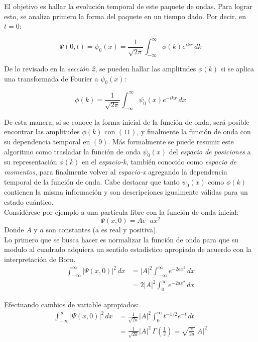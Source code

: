 El objetivo es hallar la evolución temporal de este paquete de ondas. Para lograr esto, se analiza primero la forma del 
paquete en un tiempo dado. Por decir, en $t=0$:

\begin{equation}
    \Psi(0,t) = \psi_{0}(x) = \frac{1}{\sqrt{2\pi}} \int_{-\infty}^{\infty} \phi(k)e^{ikx}\,dk
\end{equation}

De lo revisado en la \emph{sección 2}, se pueden hallar las amplitudes $\phi(k)$ si se aplica una transformada de Fourier
a $\psi_{0}(x)$:

\begin{equation}
    \phi(k) = \frac{1}{\sqrt{2\pi}} \int_{-\infty}^{\infty} \psi_{0}(x)e^{-ikx}\,dx
\end{equation}

De esta manera, si se conoce la forma inicial de la función de onda, será posible encontrar las amplitudes $\phi(k)$ con
$(11)$, y finalmente la función de onda con su dependencia temporal en $(9)$. Más formalmente se puede resumir este 
algoritmo como trasladar la función de onda $\psi_{0}(x)$ del \emph{espacio de posiciones} a su representación $\phi(k)$ 
en el \emph{espacio-k}, también conocido como \emph{espacio de momentos}, para finalmente volver al \emph{espacio-x} 
agregando la dependencia temporal de la función de onda. Cabe destacar que tanto $\psi_{0}(x)$ como $\phi(k)$ contienen 
la misma información y son descripciones igualmente válidas para un estado cuántico.\\

Considérese por ejemplo a una partícula libre con la función de onda inicial:
\begin{equation}
    \Psi(x,0) = Ae^-ax^2
\end{equation}
Donde $A$ y $a$ son constantes (a es real y positiva).\\

Lo primero que se busca hacer es normalizar la función de onda para que su modulo al cuadrado adquiera un sentido 
estadístico apropiado de acuerdo con la interpretación de Born.
\begin{align*}
    \int_{-\infty}^{\infty} \lvert\Psi(x,0)\rvert^2\,dx &= \lvert A \rvert^2 \int_{-\infty}^{\infty} e^{-2ax^2}\,dx \\
    &= 2\lvert A \rvert^2 \int_{0}^{\infty} e^{-2ax^2}\,dx
\end{align*}

Efectuando cambios de variable apropiados:
\begin{align*}
    \int_{-\infty}^{\infty} \lvert\Psi(x,0)\rvert^2\,dx &= \frac{1}{\sqrt{2a}} \lvert A \rvert^2 \int_{0}^{\infty} t^{-1/2}e^{-t}\,dt \\
    &= \frac{1}{\sqrt{2a}} \lvert A \rvert^2 \,\Gamma(\frac{1}{2}) = \sqrt{\frac{\pi}{2a}} \lvert A \rvert^2
\end{align*}

